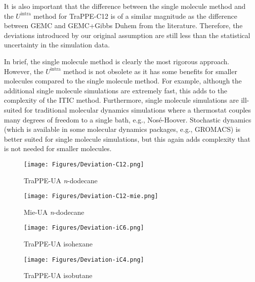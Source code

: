 \documentclass[%
 aip,
 jcp,
 sd,%
 amsmath,amssymb,
]{revtex4-1}
\begin{document}
It is also important that the difference between the single molecule method and the $U^\mathrm{intra}$ method for TraPPE-C12 is of a similar magnitude as the difference between GEMC and GEMC+Gibbs Duhem from the literature. Therefore, the deviations introduced by our original assumption are still less than the statistical uncertainty in the simulation data.

In brief, the single molecule method is clearly the most rigorous approach. However, the $U^\mathrm{intra}$ method is not obsolete as it has some benefits for smaller molecules compared to the single molecule method. For example, although the additional single molecule simulations are extremely fast, this adds to the complexity of the ITIC method. Furthermore, single molecule simulations are ill-suited for traditional molecular dynamics simulations where a thermostat couples many degrees of freedom to a single bath, e.g., Nosé-Hoover. Stochastic dynamics (which is available in some molecular dynamics packages, e.g., GROMACS) is better suited for single molecule simulations, but this again adds complexity that is not needed for smaller molecules. 
 
\begin{figure*}
\centering
\texttt{[image: Figures/Deviation-C12.png]}
\caption{
TraPPE-UA \textit{n}-dodecane
}
\label{fig:Deviation-C12}
\end{figure*}

\begin{figure*}
\centering
\texttt{[image: Figures/Deviation-C12-mie.png]}
\caption{
Mie-UA \textit{n}-dodecane
}
\label{fig:Deviation-C12-mie}
\end{figure*}

\begin{figure*}
\centering
\texttt{[image: Figures/Deviation-iC6.png]}
\caption{
TraPPE-UA isohexane
}
\label{fig:Deviation-iC6}
\end{figure*}

\begin{figure*}
\centering
\texttt{[image: Figures/Deviation-iC4.png]}
\caption{
TraPPE-UA isobutane
}
\label{fig:Deviation-iC4}
\end{figure*}






\newpage%
\clearpage

\end{document}

